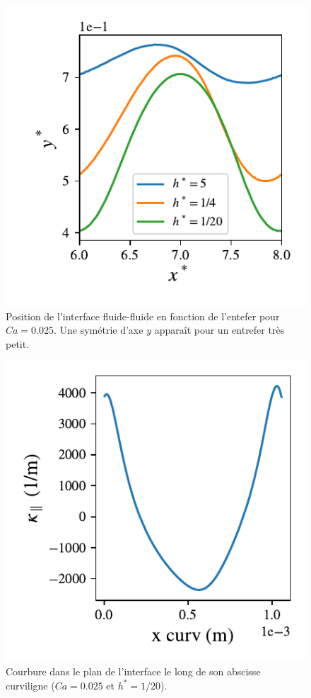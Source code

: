 \documentclass[justified]{tufte-handout}
\begin{document}
\begin{figure}
  \centering
  \includegraphics[width=0.8\linewidth]{Int.pdf}
  \caption{Position de l'interface fluide-fluide en fonction de l'entefer pour $Ca=0.025$. Une symétrie
  d'axe $y$ apparaît pour un entrefer très petit.}
  \label{fig:Int}
\end{figure}


\begin{figure}
  \centering
  \includegraphics[width=0.8\linewidth]{kappa.pdf}
  \caption{Courbure dans le plan de l'interface le long de son abscisse curviligne ($Ca=0.025$ et $h^*=1/20$).}
  \label{fig:marginkappa}
\end{figure}
\end{document}
